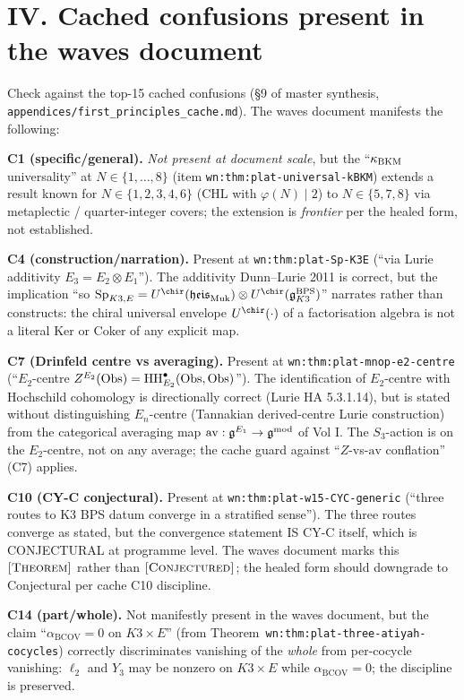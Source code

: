 \section{IV. Cached confusions present in the waves document}
\label{wn:sec:wave17-agent15-cached-confusions}

Check against the top-15 cached confusions (\S9 of master synthesis,
\verb|appendices/first_principles_cache.md|). The waves document
manifests the following:

\textbf{C1 (specific/general).} \emph{Not present at document scale}, but
the ``$\kappa_{\mathrm{BKM}}$ universality'' at $N \in \{1, \ldots, 8\}$ (item
\verb|wn:thm:plat-universal-kBKM|) extends a result known for
$N \in \{1, 2, 3, 4, 6\}$ (CHL with $\varphi(N) \mid 2$) to $N \in
\{5, 7, 8\}$ via metaplectic / quarter-integer covers; the extension
is \emph{frontier} per the healed form, not established.

\textbf{C4 (construction/narration).} Present at
\verb|wn:thm:plat-Sp-K3E| (``via Lurie additivity
$E_3 = E_2 \otimes E_1$''). The additivity Dunn--Lurie 2011 is correct,
but the implication ``so $\mathrm{Sp}_{K3, E} = U^{\chir}(\mathfrak{heis}_{\Muk}) \otimes
U^{\chir}(\fg^{\mathrm{BPS}}_{K3})$'' narrates rather than constructs:
the chiral universal envelope $U^{\chir}(\cdot)$ of a factorisation
algebra is not a literal Ker or Coker of any explicit map.

\textbf{C7 (Drinfeld centre vs averaging).} Present at
\verb|wn:thm:plat-mnop-e2-centre| (``$E_2$-centre $Z^{E_2}(\mathrm{Obs}) =
\mathrm{HH}^\bullet_{E_2}(\mathrm{Obs}, \mathrm{Obs})$''). The identification of
$E_2$-centre with Hochschild cohomology is directionally correct
(Lurie HA 5.3.1.14), but is stated without distinguishing
$E_n$-centre (Tannakian derived-centre Lurie construction) from the
categorical averaging map
$\mathrm{av}: \mathfrak{g}^{E_1} \to \mathfrak{g}^{\mathrm{mod}}$ of Vol I. The $S_3$-action
is on the $E_2$-centre, not on any average; the cache guard against
``$Z$-vs-$\mathrm{av}$ conflation'' (C7) applies.

\textbf{C10 (CY-C conjectural).} Present at
\verb|wn:thm:plat-w15-CYC-generic| (``three routes to K3 BPS datum
converge in a stratified sense''). The three routes converge as
stated, but the convergence statement IS CY-C itself, which is
CONJECTURAL at programme level. The waves document marks this
$\textsc{[Theorem]}$ rather than $\textsc{[Conjectured]}$; the
healed form should downgrade to Conjectural per cache C10 discipline.

\textbf{C14 (part/whole).} Not manifestly present in the waves
document, but the claim ``$\alpha_{\mathrm{BCOV}} = 0$ on
$K3 \times E$'' (from Theorem~\verb|wn:thm:plat-three-atiyah-cocycles|)
correctly discriminates vanishing of the \emph{whole} from per-cocycle
vanishing: $\ell_2$ and $Y_3$ may be nonzero on $K3 \times E$ while
$\alpha_{\mathrm{BCOV}} = 0$; the discipline is preserved.

